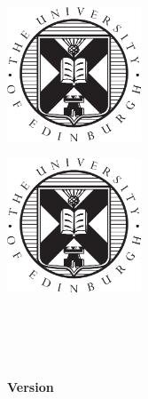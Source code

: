 \makeatletter
\begin{titlepage}
\ifdefined\@school
        \begin{minipage}{0.6\textwidth}
        \begin{flushleft}
                { \Huge  \linespread{1.15} \@school \par}
        \end{flushleft}
        \end{minipage}\hfill
        \begin{minipage}{0.3\textwidth}
                \includegraphics[width=40mm,height=40mm]{Includes/crest.eps}
        \end{minipage}
\else
{\centering \includegraphics[width=40mm,height=40mm]{Includes/crest.eps}\\}
\fi
\vspace*{4cm}

{\centering
\ifdefined\@coursecode
{\LARGE\rmfamily\scshape \@coursecode\\}
\fi
{\Huge{} \@title\\}
\vspace{\fill}
{\Large \@author \\[1ex] \LARGE\bfseries \@date \ifdefined\@version \\[2ex] \large Version \@version\fi\\}
}
\end{titlepage}
\makeatother
